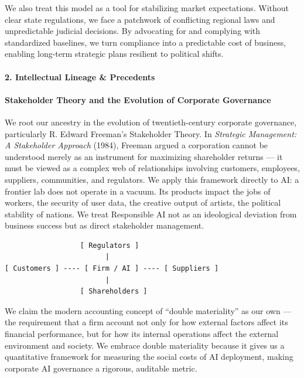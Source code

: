 We also treat this model as a tool for stabilizing market expectations.
Without clear state regulations, we face a patchwork of conflicting
regional laws and unpredictable judicial decisions. By advocating for
and complying with standardized baselines, we turn compliance into a
predictable cost of business, enabling long-term strategic plans
resilient to political shifts.

\paragraph{2. Intellectual Lineage \&
Precedents}\label{intellectual-lineage-precedents-15}

\paragraph{Stakeholder Theory and the Evolution of Corporate
Governance}\label{stakeholder-theory-and-the-evolution-of-corporate-governance}

We root our ancestry in the evolution of twentieth-century corporate
governance, particularly R. Edward Freeman's Stakeholder Theory. In
\emph{Strategic Management: A Stakeholder Approach} (1984), Freeman
argued a corporation cannot be understood merely as an instrument for
maximizing shareholder returns --- it must be viewed as a complex web of
relationships involving customers, employees, suppliers, communities,
and regulators. We apply this framework directly to AI: a frontier lab
does not operate in a vacuum. Its products impact the jobs of workers,
the security of user data, the creative output of artists, the political
stability of nations. We treat Responsible AI not as an ideological
deviation from business success but as direct stakeholder management.

\begin{verbatim}
                  [ Regulators ]
                        |
[ Customers ] ---- [ Firm / AI ] ---- [ Suppliers ]
                        |
                  [ Shareholders ]
\end{verbatim}

We claim the modern accounting concept of ``double materiality'' as our
own --- the requirement that a firm account not only for how external
factors affect its financial performance, but for how its internal
operations affect the external environment and society. We embrace
double materiality because it gives us a quantitative framework for
measuring the social costs of AI deployment, making corporate AI
governance a rigorous, auditable metric.

